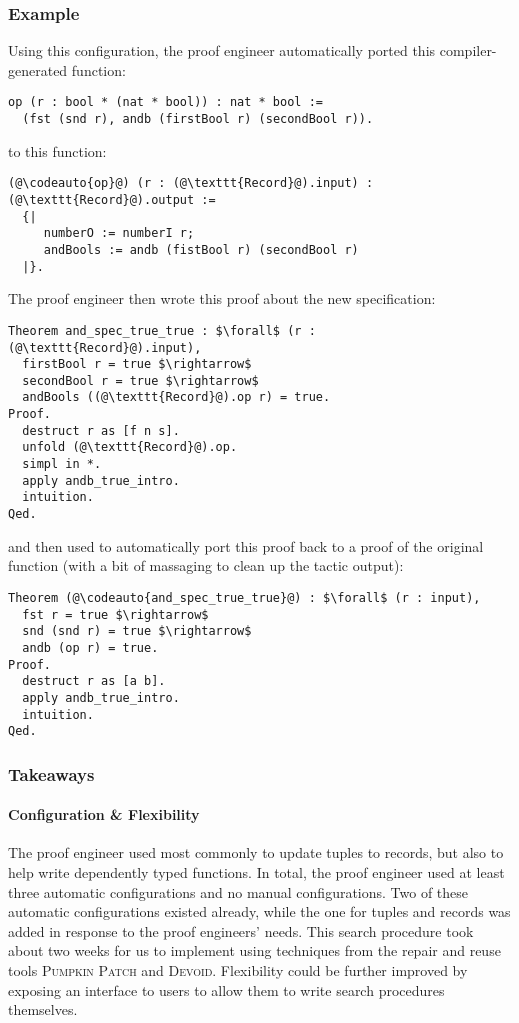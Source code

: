 \subsubsection{Example}
Using this configuration, the proof engineer automatically ported this compiler-generated function:

\begin{lstlisting}
op (r : bool * (nat * bool)) : nat * bool :=
  (fst (snd r), andb (firstBool r) (secondBool r)).
\end{lstlisting}
to this function:

\begin{lstlisting}
(@\codeauto{op}@) (r : (@\texttt{Record}@).input) : (@\texttt{Record}@).output :=
  {|
     numberO := numberI r;
     andBools := andb (fistBool r) (secondBool r)
  |}.
\end{lstlisting}
The proof engineer then wrote this proof about the new specification: %

\begin{lstlisting}
Theorem and_spec_true_true : $\forall$ (r : (@\texttt{Record}@).input),
  firstBool r = true $\rightarrow$
  secondBool r = true $\rightarrow$
  andBools ((@\texttt{Record}@).op r) = true.
Proof.
  destruct r as [f n s].
  unfold (@\texttt{Record}@).op.
  simpl in *.
  apply andb_true_intro.
  intuition.
Qed.
\end{lstlisting}
and then used \toolname to automatically port this proof back to a proof of the original function
(with a bit of massaging to clean up the tactic output): %

\begin{lstlisting}
Theorem (@\codeauto{and_spec_true_true}@) : $\forall$ (r : input),
  fst r = true $\rightarrow$
  snd (snd r) = true $\rightarrow$
  andb (op r) = true.
Proof.
  destruct r as [a b].
  apply andb_true_intro.
  intuition.
Qed.
\end{lstlisting}

\subsubsection{Takeaways}

\paragraph{Configuration \& Flexibility}
The proof engineer used \toolname most commonly to update tuples to records,
but also to help write dependently typed functions.
In total, the proof engineer used at least three automatic configurations and no manual configurations.
Two of these automatic configurations existed already, while the one for tuples and records was
added in response to the proof engineers' needs.
This search procedure took about two weeks for us to implement using techniques from
the repair and reuse tools \textsc{Pumpkin Patch} and \textsc{Devoid}.
Flexibility could be further improved by exposing an interface to users to allow them to
write search procedures themselves.

